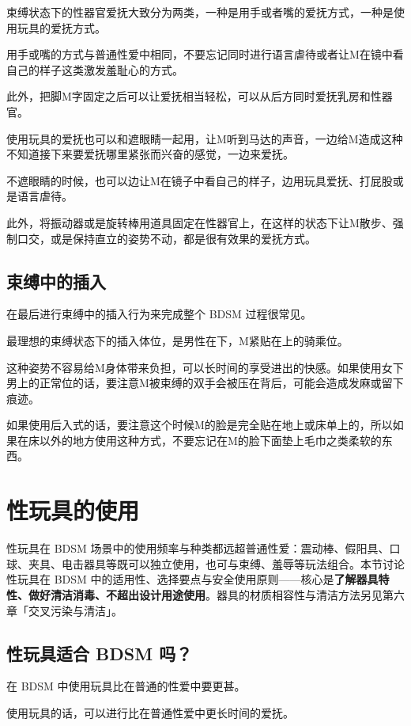 \documentclass[12pt,UTF8]{ctexbook}
\begin{document}
束缚状态下的性器官爱抚大致分为两类，一种是用手或者嘴的爱抚方式，一种是使用玩具的爱抚方式。

用手或嘴的方式与普通性爱中相同，不要忘记同时进行语言虐待或者让M在镜中看自己的样子这类激发羞耻心的方式。

此外，把脚M字固定之后可以让爱抚相当轻松，可以从后方同时爱抚乳房和性器官。

使用玩具的爱抚也可以和遮眼睛一起用，让M听到马达的声音，一边给M造成这种不知道接下来要爱抚哪里紧张而兴奋的感觉，一边来爱抚。

不遮眼睛的时候，也可以边让M在镜子中看自己的样子，边用玩具爱抚、打屁股或是语言虐待。

此外，将振动器或是旋转棒用道具固定在性器官上，在这样的状态下让M散步、强制口交，或是保持直立的姿势不动，都是很有效果的爱抚方式。 

\subsection{束缚中的插入}

在最后进行束缚中的插入行为来完成整个 BDSM 过程很常见。

最理想的束缚状态下的插入体位，是男性在下，M紧贴在上的骑乘位。

这种姿势不容易给M身体带来负担，可以长时间的享受进出的快感。如果使用女下男上的正常位的话，要注意M被束缚的双手会被压在背后，可能会造成发麻或留下痕迹。

如果使用后入式的话，要注意这个时候M的脸是完全贴在地上或床单上的，所以如果在床以外的地方使用这种方式，不要忘记在M的脸下面垫上毛巾之类柔软的东西。

\section{性玩具的使用}

性玩具在 BDSM 场景中的使用频率与种类都远超普通性爱：震动棒、假阳具、口球、夹具、电击器具等既可以独立使用，也可与束缚、羞辱等玩法组合。本节讨论性玩具在 BDSM 中的适用性、选择要点与安全使用原则——核心是\textbf{了解器具特性、做好清洁消毒、不超出设计用途使用}。器具的材质相容性与清洁方法另见第六章「交叉污染与清洁」。

\subsection{性玩具适合 BDSM 吗？}

在 BDSM 中使用玩具比在普通的性爱中要更甚。

使用玩具的话，可以进行比在普通性爱中更长时间的爱抚。
\end{document}

